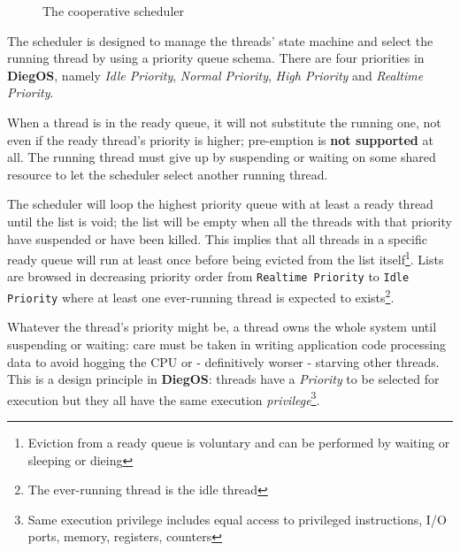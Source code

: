 \documentclass[11pt,b5paper]{scrbook}
\newcommand{\myOS}{{\color{SteelBlue}\textbf{DiegOS}}}
\begin{document}
\begin{description}
\begin{figure}
{
}

\caption{The cooperative scheduler}
\label{fig:tikz-thescheduler}
\end{figure}

The scheduler is designed to manage the threads' state machine and select 
the running thread by using a priority queue schema. There are four
priorities in {\myOS}, namely \textit{Idle Priority}, \textit{Normal Priority}, 
\textit{High Priority} and \textit{Realtime Priority}.

When a thread is in the ready queue, it will not substitute the running
one, not even if the ready thread's priority is higher; pre-emption is \textbf{not
supported} at all.
The running thread must give up by suspending or waiting on some shared resource to let
the scheduler select another running thread.

The scheduler will loop the highest priority queue with at least a ready thread until the
list is void; the list will be empty when all the threads with that priority have suspended or have
been killed.
This implies that all threads in a specific ready queue will run at least once before being evicted
from the list itself\footnote{Eviction from a ready queue is voluntary and can be performed by waiting or sleeping or dieing}.
Lists are browsed in decreasing priority order from \texttt{Realtime Priority} to \texttt{Idle Priority} where at least one ever-running
thread is expected to exists\footnote{The ever-running thread is the idle thread}.

Whatever the thread's priority might be, a thread owns the whole system until suspending or waiting: care must be taken
in writing application code processing data to avoid hogging the CPU or - definitively worser - starving other
threads.
This is a design principle in {\myOS}: threads have a \textit{Priority} to be selected for execution
but they all have the same execution \textit{privilege}\footnote{Same execution privilege includes
equal access to privileged instructions, I/O ports, memory, registers, counters}.


\end{description}
\end{document}
